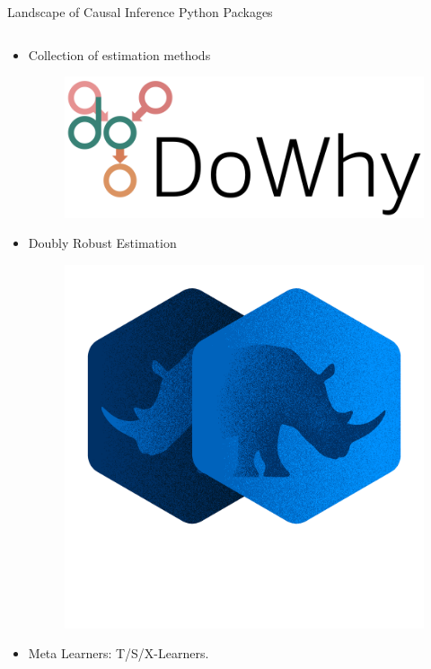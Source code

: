 \documentclass{beamer}
\begin{document}
\begin{frame}{Landscape of Causal Inference Python Packages}
	\begin{columns}
		\begin{column}{0.5 \textwidth}
			\begin{itemize}
				\item Collection of estimation methods
					\begin{figure}
						\includegraphics[scale=0.2]{imgs/dowhy.png}
					\end{figure}
				\item Doubly Robust Estimation
					\begin{figure}
						\includegraphics[scale=0.1]{imgs/doubleml.png}
					\end{figure}
				\item Meta Learners: T/S/X-Learners.

\end{itemize}
\end{column}
\end{columns}
\end{frame}
\end{document}
